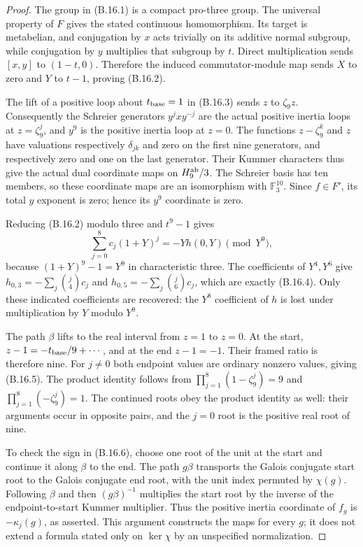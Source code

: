 \begin{proof}
The group in (B.16.1) is a compact pro-three group.
The universal property of $F$ gives the stated
continuous homomorphism.  Its target is metabelian,
and conjugation by $x$ acts trivially on its additive
normal subgroup, while conjugation by $y$ multiplies
that subgroup by $t$.  Direct multiplication sends
$[x,y]$ to $(1-t,0)$.  Therefore the induced
commutator-module map sends $X$ to zero and $Y$ to
$t-1$, proving (B.16.2).

The lift of a positive loop about $t_{\rm base}=1$
in (B.16.3) sends $z$ to $\zeta_9z$.
Consequently the Schreier generators
$y^jxy^{-j}$ are the actual positive inertia loops
at $z=\zeta_9^j$, and $y^9$ is the positive inertia
loop at $z=0$.  The functions $z-\zeta_9^k$ and $z$
have valuations respectively $\delta_{jk}$ and zero
on the first nine generators, and respectively zero
and one on the last generator.  Their Kummer
characters thus give the actual dual coordinate
maps on $H_9^{\rm ab}/3$.
The Schreier basis has ten members, so these
coordinate maps are an isomorphism with
$\mathbb F_3^{10}$.
Since $f\in F'$, its total $y$ exponent is zero;
hence its $y^9$ coordinate is zero.

Reducing (B.16.2) modulo three and $t^9-1$ gives
\[
       \sum_{j=0}^8c_j(1+Y)^j=-Yh(0,Y)\pmod{Y^9},
                                                               \tag{B.16.7}
\]
because $(1+Y)^9-1=Y^9$ in characteristic three.
The coefficients of $Y^4,Y^6$ give
$h_{0,3}=-\sum_j\binom j4c_j$ and
$h_{0,5}=-\sum_j\binom j6c_j$, which are exactly
(B.16.4).
Only these indicated coefficients are recovered:
the $Y^8$ coefficient of $h$ is lost under
multiplication by $Y$ modulo $Y^9$.

The path $\beta$ lifts to the real interval from
$z=1$ to $z=0$.  At the start,
$z-1=-t_{\rm base}/9+\cdots$, and at the end
$z-1=-1$.  Their framed ratio is therefore nine.
For $j\ne0$ both endpoint values are ordinary
nonzero values, giving (B.16.5).
The product identity follows from
$\prod_{j=1}^8(1-\zeta_9^j)=9$ and
$\prod_{j=1}^8(-\zeta_9^j)=1$.
The continued roots obey the product identity as
well: their arguments occur in opposite pairs,
and the $j=0$ root is the positive real root of nine.

To check the sign in (B.16.6), choose one root of
the unit at the start and continue it along $\beta$
to the end.  The path $g\beta$ transports the
Galois conjugate start root to the Galois conjugate
end root, with the unit index permuted by $\chi(g)$.
Following $\beta$ and then $(g\beta)^{-1}$ multiplies
the start root by the inverse of the
endpoint-to-start Kummer multiplier.  Thus the
positive inertia coordinate of $f_g$ is
$-\kappa_j(g)$, as asserted.
This argument constructs the maps for every $g$;
it does not extend a formula stated only on
$\ker\chi$ by an unspecified normalization.


\end{proof}
